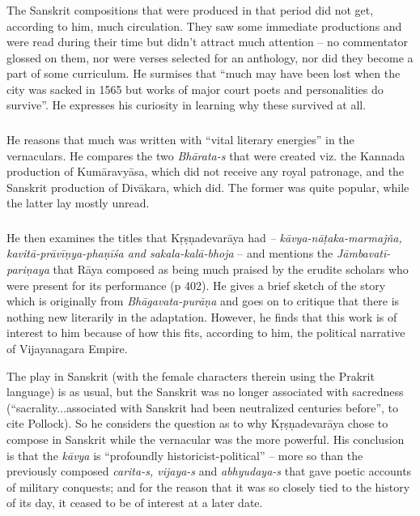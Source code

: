 \subsubsection{} The Sanskrit compositions that were produced in that period did not get, according to him, much circulation. They saw some immediate productions and were read during their time but didn’t attract much attention – no commentator glossed on them, nor were verses selected for an anthology, nor did they become a part of some curriculum. He surmises that “much may have been lost when the city was sacked in 1565 but works of major court poets and personalities do survive”. He expresses his curiosity in learning why these survived at all.

\subsubsection{} He reasons that much was written with “vital literary energies” in the vernaculars. He compares the two {\sl Bhārata-s} that were created viz. the Kannada production of Kumāravyāsa, which did not receive any royal patronage, and the Sanskrit production of Divākara, which did. The former was quite popular, while the latter lay mostly unread.

\subsubsection{} He then examines the titles that Kṛṣṇadevarāya had {\sl – kāvya-nāṭaka-marmajña, kavitā-prāvīṇya-phaṇīśa and sakala-kalā-bhoja} – and mentions the {\sl Jāmbavatī-pariṇaya} that Rāya composed as being much praised by the erudite scholars who were present for its performance (p 402). He gives a brief sketch of the story which is originally from {\sl Bhāgavata-purāṇa} and goes on to critique that there is nothing new literarily in the adaptation. However, he finds that this work is of interest to him because of how this fits, according to him, the political narrative of Vijayanagara Empire.

The play in Sanskrit (with the female characters therein using the Prakrit language) is as usual, but the Sanskrit was no longer associated with sacredness (“sacrality...associated with Sanskrit had been neutralized centuries before”, to cite Pollock). So he considers the question as to why Kṛṣṇadevarāya chose to compose in Sanskrit while the vernacular was the more powerful. His conclusion is that the {\sl kāvya} is “profoundly historicist-political” – more so than the previously composed {\sl carita-s, vijaya-s} and {\sl abhyudaya-s} that gave poetic accounts of military conquests; and for the reason that it was so closely tied to the history of its day, it ceased to be of interest at a later date.	

